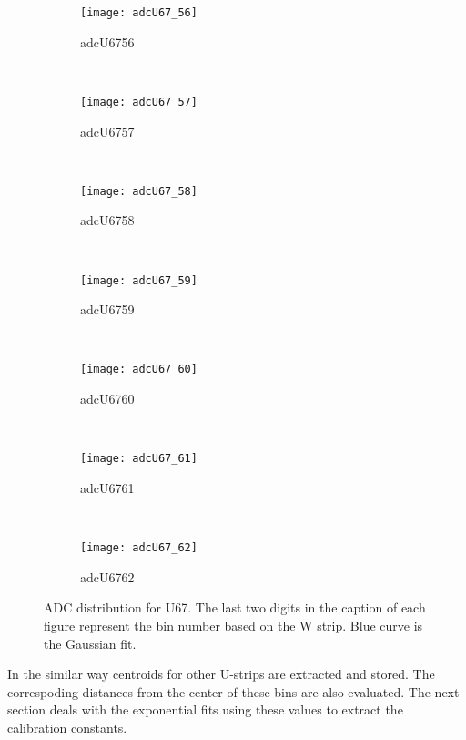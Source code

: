 \begin{figure}[h]
    \centering
    \begin{subfigure}[h]{0.3\textwidth}
        \centering
        \texttt{[image: adcU67\_56]}
        \caption{adcU6756}
        \label{fig:adcU67_56}
    \end{subfigure}
    ~
    \begin{subfigure}[h]{0.3\textwidth}
        \centering
        \texttt{[image: adcU67\_57]}
        \caption{adcU6757}
        \label{fig:adcU67_57}
    \end{subfigure}
    ~
    \begin{subfigure}[h]{0.3\textwidth}
        \centering
        \texttt{[image: adcU67\_58]}
        \caption{adcU6758}
        \label{fig:adcU67_58}
    \end{subfigure}
    \\
    \begin{subfigure}[h]{0.3\textwidth}
        \centering
        \texttt{[image: adcU67\_59]}
        \caption{adcU6759}
        \label{fig:adcU67_59}
    \end{subfigure}
    ~
    \begin{subfigure}[h]{0.3\textwidth}
        \centering
        \texttt{[image: adcU67\_60]}
        \caption{adcU6760}
        \label{fig:adcU67_60}
    \end{subfigure}
    ~
    \begin{subfigure}[h]{0.3\textwidth}
        \centering
        \texttt{[image: adcU67\_61]}
        \caption{adcU6761}
        \label{fig:adcU67_61}
    \end{subfigure}
    \\
    \begin{subfigure}[h]{0.3\textwidth}
        \centering
        \texttt{[image: adcU67\_62]}
        \caption{adcU6762}
        \label{fig:adcU67_62}
    \end{subfigure}
    \caption{ADC distribution for U67. The last two digits in the caption of each figure represent the bin number based on the W strip.
    Blue curve is the Gaussian fit.}
    \label{fig:adcU5}
\end{figure}
\FloatBarrier
In the similar way centroids for other U-strips are extracted and stored. The correspoding distances from the center of these bins
are also evaluated. The next section deals with the exponential fits using these values to extract the calibration constants.

